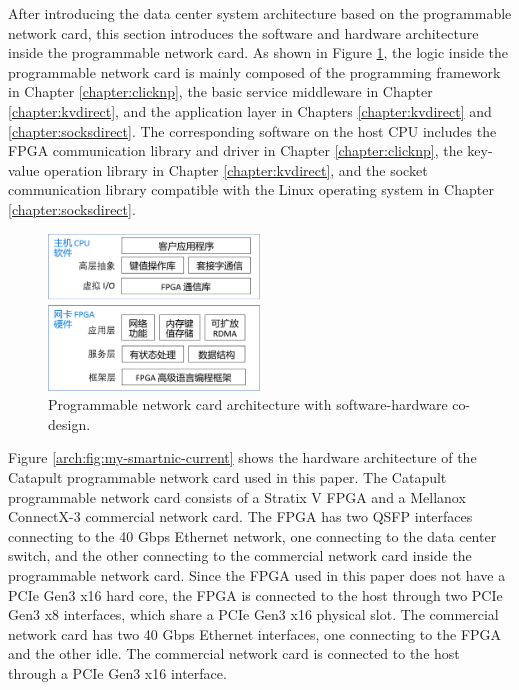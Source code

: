 After introducing the data center system architecture based on the programmable network card, this section introduces the software and hardware architecture inside the programmable network card. As shown in Figure \ref{arch:fig:sw-hw-codesign}, the logic inside the programmable network card is mainly composed of the programming framework in Chapter \ref{chapter:clicknp}, the basic service middleware in Chapter \ref{chapter:kvdirect}, and the application layer in Chapters \ref{chapter:kvdirect} and \ref{chapter:socksdirect}. The corresponding software on the host CPU includes the FPGA communication library and driver in Chapter \ref{chapter:clicknp}, the key-value operation library in Chapter \ref{chapter:kvdirect}, and the socket communication library compatible with the Linux operating system in Chapter \ref{chapter:socksdirect}.

\begin{figure}[htbp]
	\centering
	\includegraphics[width=0.5\textwidth]{figures/sw_hw_codesign.pdf}
	\caption{Programmable network card architecture with software-hardware co-design.}
	\label{arch:fig:sw-hw-codesign}
\end{figure}


Figure \ref{arch:fig:my-smartnic-current} shows the hardware architecture of the Catapult programmable network card \cite{putnam2014reconfigurable} used in this paper.
The Catapult programmable network card consists of a Stratix V FPGA and a Mellanox ConnectX-3 commercial network card. The FPGA has two QSFP interfaces connecting to the 40 Gbps Ethernet network, one connecting to the data center switch, and the other connecting to the commercial network card inside the programmable network card. Since the FPGA used in this paper does not have a PCIe Gen3 x16 hard core, the FPGA is connected to the host through two PCIe Gen3 x8 interfaces, which share a PCIe Gen3 x16 physical slot. The commercial network card has two 40 Gbps Ethernet interfaces, one connecting to the FPGA and the other idle. The commercial network card is connected to the host through a PCIe Gen3 x16 interface.

